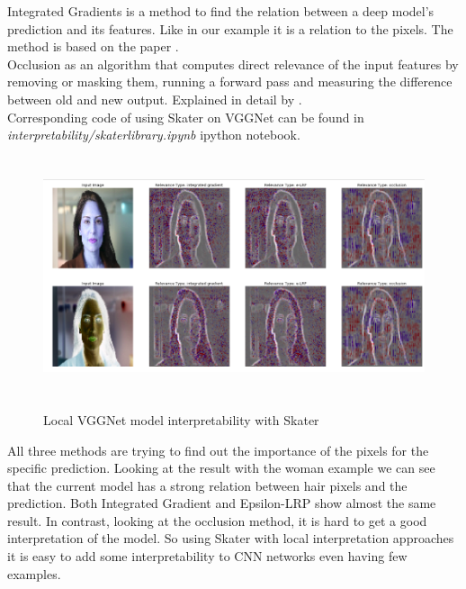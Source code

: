 Integrated Gradients is a method to find the relation between a deep model's prediction and its features. Like in our example it is a relation to the pixels. The method is based on the paper \cite{Integrated_Gradients}. \\

Occlusion as an algorithm that computes direct relevance of the input features by removing or masking them, running a forward pass and measuring the difference between old and new output. Explained in detail by \cite{Occlusion}. \\

Corresponding code of using Skater on VGGNet can be found in \textit{interpretability/skater\textunderscore library.ipynb} ipython notebook. \\


\begin{figure}[!htb]
\centering
\includegraphics[height=7cm]{skater_ex1.png}\\[0.5cm] 
\caption{Local VGGNet model interpretability with Skater}
\end{figure}


All three methods are trying to find out the importance of the pixels for the specific prediction.
Looking at the result with the woman example we can see that the current model has a strong relation between hair pixels and the prediction. Both Integrated Gradient and Epsilon-LRP show almost the same result. In contrast, looking at the occlusion method, it is hard to get a good interpretation of the model. So using Skater with local interpretation approaches it is easy to add some interpretability to CNN networks even having few examples.

